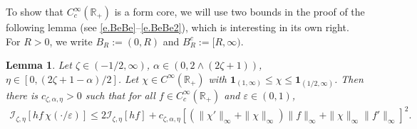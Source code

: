 \documentclass[12pt,reqno]{amsart}
\newtheorem{lemma}[theorem]{Lemma}
\theoremstyle{definition}
\theoremstyle{remark}
\numberwithin{equation}{section}
\newcommand{\1}{\mathbbm{1}}
\renewcommand{\epsilon}{\varepsilon}
\newcommand{\R}{\mathbb{R}}
\def\ci{\mathcal{I}}
\newcommand{\one}{\mathbf{1}}
\begin{document}
To show that $C_c^\infty(\R_+)$ is a form core, we will use two bounds in the proof of the following lemma (see \eqref{e.BeBe}--\eqref{e.BeBe2}), which is interesting in its own right. For $R>0$, we write $B_R:=(0,R)$ and $B_R^c:=[R,\infty)$.

\begin{lemma}
  \label{boglem53}
  Let $\zeta\in(-1/2,\infty)$, $\alpha\in(0,2\wedge(2\zeta+1))$, $\eta\in[0,(2\zeta+1-\alpha)/2]$. Let $\chi\in C^\infty(\R_+)$ with $\one_{(1,\infty)}\leq\chi\leq\one_{(1/2,\infty)}$. Then there is $c_{\zeta,\alpha,\eta}>0$ such that for all $f\in C_c^\infty(\R_+)$ and $\epsilon\in(0,1)$,
  \begin{align}
    \label{eq:boglem53}
    \ci_{\zeta,\eta}[h f\, \chi(\cdot/\epsilon)]
    \leq 2\ci_{\zeta,\eta}[h f] + c_{\zeta,\alpha,\eta} \left[(\|\chi'\|_\infty + \|\chi\|_\infty) \|f\|_\infty + \|\chi\|_\infty \|f'\|_\infty\right]^2.
  \end{align}
\end{lemma}
\end{document}
